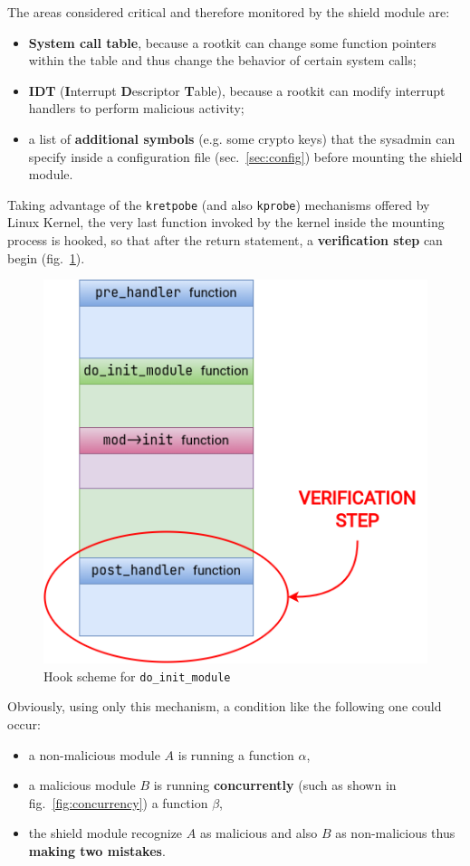 \documentclass{article}
\begin{document}
	The areas considered critical and therefore monitored by the shield module are:
	\begin{itemize}
		\item \textbf{System call table}, because a rootkit can change some function pointers within the table and thus
		change the behavior of certain system calls;
		\item \textbf{IDT} (\textbf{I}nterrupt \textbf{D}escriptor \textbf{T}able), because a rootkit can modify
		interrupt handlers to perform malicious activity;
		\item a list of \textbf{additional symbols} (e.g. some crypto keys) that the sysadmin can specify inside a
		configuration file (sec.~\ref{sec:config}) before mounting the shield module.
	\end{itemize}

	Taking advantage of the \texttt{kretpobe} (and also \texttt{kprobe}) mechanisms offered by Linux
	Kernel, the very last function invoked by the kernel inside the mounting process is hooked, so
	that after the return statement, a \textbf{verification step} can begin (fig.~\ref{fig:monitoring}).

	\begin{figure}[!htbp]
		\centering
		\includegraphics[scale=0.4]{monitoring}
		\caption{Hook scheme for \texttt{do\_init\_module}}
		\label{fig:monitoring}
	\end{figure}

	Obviously, using only this mechanism, a condition like the following one could occur:
	\begin{itemize}
		\item a non-malicious module $A$ is running a function $\alpha$,
		\item a malicious module $B$ is running \textbf{concurrently} (such as shown in fig.~\ref{fig:concurrency}) a
		function $\beta$,
		\item the shield module recognize $A$ as malicious and also $B$ as non-malicious thus \textbf{making two
		mistakes}.
	\end{itemize}
\end{document}
